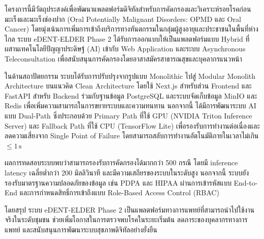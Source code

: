 \maketitle
\makesignature

\ifproject
\begin{abstractTH}
โครงการนี้มีวัตถุประสงค์เพื่อพัฒนาแพลตฟอร์มดิจิทัลสำหรับการคัดกรองและวิเคราะห์รอยโรคก่อนมะเร็งและมะเร็งช่องปาก (Oral Potentially Malignant Disorders: OPMD และ Oral Cancer) โดยมุ่งเน้นการเพิ่มการเข้าถึงบริการทางทันตกรรมในกลุ่มผู้สูงอายุและประชาชนในพื้นที่ห่างไกล ระบบ eDENT-ELDER Phase 2 ได้รับการออกแบบให้เป็นแพลตฟอร์มแบบ Hybrid ที่ผสานเทคโนโลยีปัญญาประดิษฐ์ (AI) เข้ากับ Web Application และระบบ Asynchronous Teleconsultation เพื่อสนับสนุนการคัดกรองโดยอาสาสมัครสาธารณสุขและบุคลากรแนวหน้า

ในด้านสถาปัตยกรรม ระบบได้รับการปรับปรุงจากรูปแบบ Monolithic ไปสู่ Modular Monolith Architecture บนแนวคิด Clean Architecture โดยใช้ Next.js สำหรับส่วน Frontend และ FastAPI สำหรับ Backend ร่วมกับฐานข้อมูล PostgreSQL และระบบจัดเก็บข้อมูล MinIO และ Redis เพื่อเพิ่มความสามารถในการขยายระบบและความทนทาน นอกจากนี้ ได้มีการพัฒนาระบบ AI แบบ Dual-Path ซึ่งประกอบด้วย Primary Path ที่ใช้ GPU (NVIDIA Triton Inference Server) และ Fallback Path ที่ใช้ CPU (TensorFlow Lite) เพื่อรองรับการทำงานต่อเนื่องและลดความเสี่ยงจาก Single Point of Failure โดยสามารถสลับการทำงานอัตโนมัติภายในเวลาไม่เกิน $\leq 1\,\text{s}$

ผลการทดสอบระบบพบว่าสามารถรองรับการคัดกรองได้มากกว่า 500 กรณี โดยมี inference latency เฉลี่ยต่ำกว่า 200 มิลลิวินาที และมีความเสถียรของระบบในระดับสูง นอกจากนี้ ระบบยังรองรับมาตรฐานความปลอดภัยของข้อมูล เช่น PDPA และ HIPAA ผ่านการเข้ารหัสแบบ End-to-End และการกำหนดสิทธิ์การเข้าถึงแบบ Role-Based Access Control (RBAC)

โดยสรุป ระบบ eDENT-ELDER Phase 2 เป็นแพลตฟอร์มทางการแพทย์ที่สามารถนำไปใช้งานจริงในระดับชุมชน ช่วยเพิ่มโอกาสในการตรวจพบโรคในระยะเริ่มต้น ลดภาระของบุคลากรทางการแพทย์ และสนับสนุนการพัฒนาระบบสุขภาพดิจิทัลอย่างยั่งยืน
\end{abstractTH}


